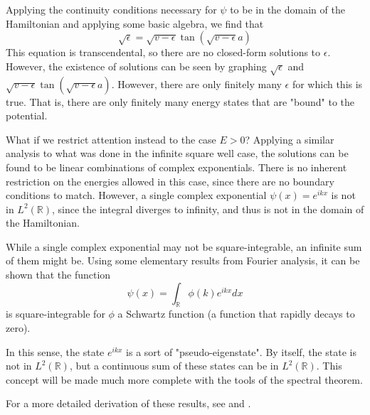 Applying the continuity conditions necessary for $\psi$ to be in the domain of
the Hamiltonian and applying some basic algebra, we find that
\[
    \sqrt{\epsilon} = \sqrt{v-\epsilon}\tan(\sqrt{v-\epsilon}a)
\]
This equation is transcendental, so there are no closed-form solutions to
$\epsilon$. However, the existence of solutions can be seen by graphing
$\sqrt{\epsilon}$ and $\sqrt{v-\epsilon}\tan(\sqrt{v-\epsilon}a)$. %
However, there are only finitely many $\epsilon$ for which this is true. That
is, there are only finitely many energy states that are "bound" to the
potential.

What if we restrict attention instead to the case $E>0$? Applying a similar
analysis to what was done in the infinite square well case, the solutions can be
found to be linear combinations of complex exponentials. There is no inherent
restriction on the energies allowed in this case, since there are no boundary
conditions to match. However, a single complex exponential $\psi(x) = e^{ikx}$
is not in $L^2(\mathbb{R})$, since the integral diverges to infinity, and thus
is not in the domain of the Hamiltonian.

While a single complex exponential may not be square-integrable, an infinite sum
of them might be. Using some elementary results from Fourier analysis, it can be
shown that the function
\[
    \psi(x) = \int_{\mathbb{R}} \phi(k)e^{ikx}dx
\]
is square-integrable for $\phi$ a Schwartz function (a function that rapidly
decays to zero). %

In this sense, the state $e^{ikx}$ is a sort of "pseudo-eigenstate". By itself,
the state is not in $L^2(\mathbb{R})$, but a continuous sum of these states can
be in $L^2(\mathbb{R})$. This concept will be made much more complete with the
tools of the spectral theorem.

For a more detailed derivation of these results, see \cite[p. 109-120]{Hall2013}
and \cite[p. 78-82]{griffiths2005}.
